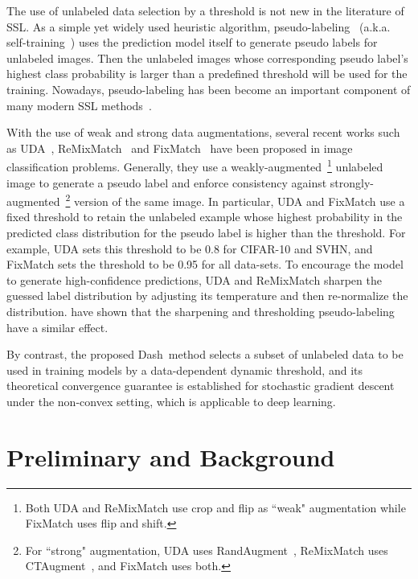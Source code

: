 \documentclass{article}
\def \Alg {Dash}
\begin{document}
The use of unlabeled data selection by a threshold is not new in the literature of SSL. As a simple yet widely used heuristic algorithm, pseudo-labeling~\citep{lee2013pseudo} (a.k.a. self-training~\citep{mclachlan1975iterative,yarowsky1995unsupervised,rosenberg2005semi,sajjadi2016regularization,laine2017temporal,xie2020self}) uses the prediction model itself to generate pseudo labels for unlabeled images. Then the unlabeled images whose corresponding pseudo label's highest class probability is larger than a predefined threshold will be used for the training. Nowadays, pseudo-labeling has been become an important component of many modern SSL methods~\citep{xie2020unsupervised,sohn2020fixmatch}. 

With the use of weak and strong data augmentations, several recent works such as UDA~\citep{xie2020unsupervised}, ReMixMatch~\citep{berthelot2019remixmatch} and FixMatch~\citep{sohn2020fixmatch} have been proposed in image classification problems. Generally, they use a weakly-augmented~\footnote{Both UDA and ReMixMatch use crop and flip as ``weak" augmentation while FixMatch uses flip and shift.} unlabeled image to generate a pseudo label and enforce consistency against strongly-augmented~\footnote{For ``strong" augmentation, UDA uses RandAugment~\citep{cubuk2020randaugment}, ReMixMatch uses CTAugment~\citep{cubuk2019autoaugment}, and FixMatch uses both.} version of the same image.  In particular, UDA and FixMatch use a fixed threshold to retain the unlabeled example whose highest probability in the predicted class distribution for the pseudo label is higher than the threshold. For example, UDA sets this threshold to be 0.8 for CIFAR-10 and SVHN, and FixMatch sets the threshold to be 0.95 for all data-sets. To encourage the model to generate high-confidence predictions, UDA and ReMixMatch sharpen the guessed label distribution by adjusting its temperature and then re-normalize the distribution. \cite{sohn2020fixmatch} have shown that the sharpening and thresholding pseudo-labeling have a similar effect.

By contrast, the proposed \Alg~method selects a subset of unlabeled data to be used in training models by a data-dependent dynamic threshold, and its theoretical convergence guarantee is established for stochastic gradient descent under the non-convex setting, which is applicable to deep learning.  

\section{Preliminary and Background}
\end{document}
